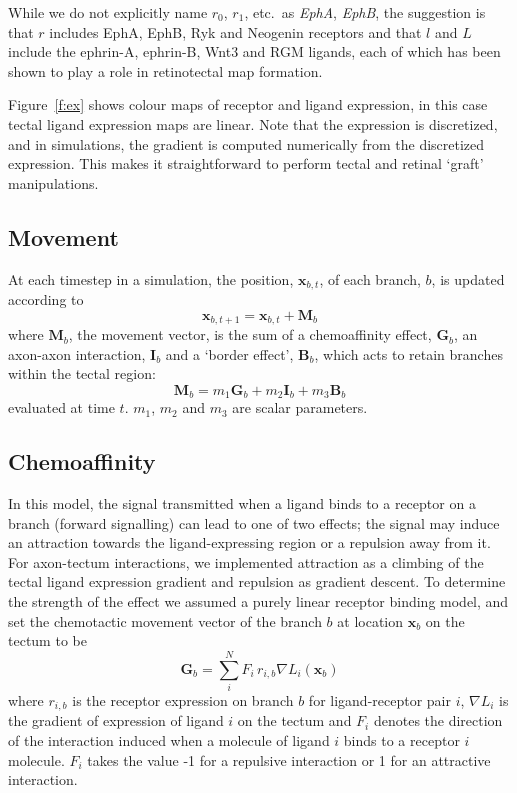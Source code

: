 \documentclass[11pt, a4paper]{article}
\begin{document}
While we do not explicitly name $r_0$, $r_1$,
etc.~as \emph{EphA}, \emph{EphB}, the suggestion is that $r$ includes EphA,
EphB, Ryk \citep{schmitt_wntryk_2006} and
Neogenin \citep{rajagopalan_neogenin_2004} receptors and that $l$ and $L$
include the ephrin-A, ephrin-B, Wnt3 \citep{schmitt_wntryk_2006} and
RGM \citep{monnier_rgm_2002} ligands, each of which has been shown to play a
role in retinotectal map formation.

Figure~\ref{f:ex} shows colour maps of receptor and ligand
expression, in this case tectal ligand expression maps are linear. Note that
the expression is discretized, and in simulations, the gradient is computed
numerically from the discretized expression. This makes it straightforward to
perform tectal and retinal `graft' manipulations.

\subsection*{Movement}

At each timestep in a simulation, the position, $\mathbf{x}_{b,t}$, of each
branch, $b$, is updated according to
%
\begin{equation}
\mathbf{x}_{b,t+1} = \mathbf{x}_{b,t} + \mathbf{M}_{b}
\end{equation}
%
where $\mathbf{M}_{b}$, the movement vector, is the sum of a chemoaffinity
effect, $\mathbf{G}_b$, an axon-axon interaction, $\mathbf{I}_b$ and a `border effect',
$\mathbf{B}_b$, which acts to retain branches within the tectal region:
%
\begin{equation}
\mathbf{M}_{b} = m_1 \mathbf{G}_b + m_2 \mathbf{I}_b + m_3 \mathbf{B}_b
\end{equation}
%
evaluated at time $t$. $m_1$, $m_2$ and $m_3$ are scalar parameters.

\subsection*{Chemoaffinity}

In this model, the signal transmitted when a ligand binds to a receptor on a
branch (forward signalling) can lead to one of two effects; the signal may
induce an attraction towards the ligand-expressing region or a repulsion away
from it.
%
For axon-tectum interactions, we implemented attraction as a climbing of the
tectal ligand expression gradient and repulsion as gradient descent.
%
To determine the strength of the effect we assumed a purely linear receptor
binding model, and set the chemotactic movement vector of the branch $b$ at
location $\mathbf{x}_b$ on the tectum to be
%
\begin{equation}
\mathbf{G}_b = \sum_i^N F_i\,r_{i,b} \nabla L_i(\mathbf{x}_b)
\end{equation}
%
where $r_{i,b}$ is the receptor expression on branch $b$ for ligand-receptor
pair $i$, $\nabla L_i$ is the gradient of expression of ligand $i$ on the
tectum and $F_i$ denotes the direction of the interaction induced when a
molecule of ligand $i$ binds to a receptor $i$ molecule. $F_i$ takes the value
-1 for a repulsive interaction or 1 for an attractive interaction.
\end{document}
